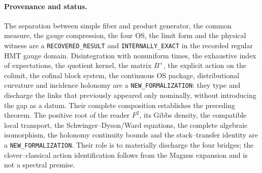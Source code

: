 \paragraph{Provenance and status.}
The separation between simple fiber and product generator, the common measure, the gauge
compression, the four OS, the limit form and the physical witness are a
\texttt{RECOVERED\_RESULT} and \texttt{INTERNALLY\_EXACT} in the recorded regular
HMT gauge domain. Disintegration with nonuniform times, the exhaustive
index of expectations, the quotient kernel, the matrix $B^+$, the explicit action
on the colimit, the cofinal block system, the continuous OS package, distributional
curvature and incidence holonomy are a
\texttt{NEW\_FORMALIZATION}: they type and discharge the links that previously appeared
only nominally, without introducing the gap as a datum. Their complete composition
establishes the preceding theorem.
The positive root of the reader $F^2$, its Gibbs density, the compatible local transport,
the Schwinger--Dyson/Ward equations, the complete algebraic isomorphism, the
holonomy continuity bounds and the stack--transfer identity are a
\texttt{NEW\_FORMALIZATION}. Their role is to materially discharge the four
bridges; the clover--classical action identification follows from the Magnus
expansion and is not a spectral premise.

